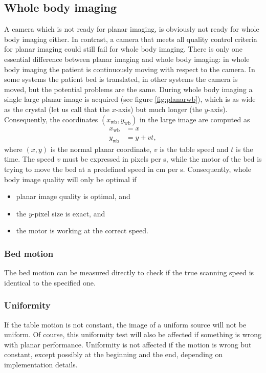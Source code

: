 \documentclass[11pt,oneside]{book}
\begin{document}
\subsection{Whole body imaging}
A camera which is not ready for planar imaging, is obviously not ready
for whole body imaging either. In contrast, a camera that meets all
quality control criteria for planar imaging could still fail for whole
body imaging. There is only one essential difference between planar
imaging and whole body imaging: in whole body imaging the patient is
continuously moving with respect to the camera. In some systems the
patient bed is translated, in other systems the camera is moved, but
the potential problems are the same. During whole body imaging a
single large planar image is acquired (see figure
\ref{fig:planarwb}), which is as wide as the crystal (let us call
that the $x$-axis) but much longer (the $y$-axis). Consequently, the
coordinates $(x_{\mbox{wb}}, y_{\mbox{wb}})$ in the large image are
computed as
\begin{align}
  x_{\mbox{wb}} &= x\\
  y_{\mbox{wb}} &= y + v t,
\end{align}
where $(x,y)$ is the normal planar coordinate, $v$ is the table speed and $t$
is the time. The speed $v$ must be expressed in pixels per s, while the motor
of the bed is trying to move the bed at a predefined speed in cm per
s. Consequently, whole body image quality will only be optimal if
\begin{itemize}
  \item planar image quality is optimal, and
  \item the $y$-pixel size is exact, and
  \item the motor is working at the correct speed.
\end{itemize}

\subsubsection{Bed motion}
The bed motion can be measured directly to check if the true scanning
speed is identical to the specified one.

\subsubsection{Uniformity}
If the table motion is not constant, the image of a uniform source will not be
uniform. Of course, this uniformity test will also be affected if something is
wrong with planar performance. Uniformity is not affected if the motion is
wrong but constant, except possibly at the beginning and the end, depending on
implementation details.
\end{document}
